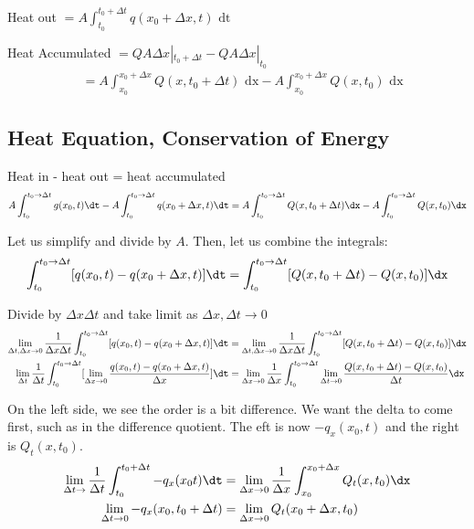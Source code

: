 Heat out $ = A\int_{t_0}^{t_0 + \Delta t} q(x_0 + \Delta x, t) \text{ dt}$

Heat Accumulated $ = QA\Delta x |_{t_0 + \Delta t} - QA\Delta x|_{t_0}$
%
\begin{align}
  & = A\int^{x_0 + \Delta x}_{x_0} Q(x, t_0 + \Delta t) \text{ dx} - A\int^{x_0 + \Delta x}_{x_0} Q(x, t_0) \text{ dx}
\end{align}

\bigbreak

\subsection{Heat Equation, Conservation of Energy}


Heat in - heat out = heat accumulated
%
\begin{align}
  A \int^{t_0 \rightarrow \Delta t}_{t_0} g(x_0, t) \dt -
  A \int^{t_0 \rightarrow \Delta t}_{t_0} q(x_0 + \Delta x, t) \dt =
  A \int^{t_0 \rightarrow \Delta t}_{t_0} Q(x, t_0 + \Delta t) \dx -
  A \int^{t_0 \rightarrow \Delta t}_{t_0} Q(x, t_0) \dx
\end{align}

Let us simplify and divide by $A$. Then, let us combine the integrals:
%
\begin{align}
  \int^{t_0 \rightarrow \Delta t}_{t_0} [q(x_0, t) - q(x_0 + \Delta x, t)] \dt =
  \int^{t_0 \rightarrow \Delta t}_{t_0} [Q(x, t_0 + \Delta t) - Q(x, t_0)] \dx
\end{align}

Divide by $\Delta x \Delta t$ and take limit as $\Delta x, \Delta t \rightarrow 0$
%
\begin{align}
  \lim_{\Delta t, \Delta x \rightarrow 0} \frac{1}{\Delta x \Delta t}
  \int^{t_0 \rightarrow \Delta t}_{t_0} [q(x_0, t) - q(x_0 + \Delta x, t)] \dt & =
  \lim_{\Delta t, \Delta x \rightarrow 0} \frac{1}{\Delta x \Delta t}
  \int^{t_0 \rightarrow \Delta t}_{t_0} [Q(x, t_0 + \Delta t) - Q(x, t_0)] \dx\\
  \lim_{\Delta t} \frac{1}{\Delta t} \int^{t_0 \rightarrow \Delta t}_{t_0} [\lim_{\Delta x \rightarrow 0} \frac{q(x_0, t) - q(x_0 + \Delta x, t)}{\Delta x}] \dt & =
  \lim_{\Delta x \rightarrow 0} \frac{1}{\Delta x}
  \int^{t_0 \rightarrow \Delta t}_{t_0} \lim_{\Delta t \rightarrow 0} \frac
  {Q(x, t_0 + \Delta t) - Q(x, t_0)}{\Delta t} \dx
\end{align}

On the left side, we see the order is a bit difference. We want the delta to come first, such as in the difference quotient. The eft is now $-q_x(x_0, t)$ and the right is $Q_t(x, t_0)$.
%
\begin{align}
  \lim_{\Delta t \rightarrow} \frac{1}{\Delta t} \int^{t_0 + \Delta t}_{t_0} - q_x(x_0 t) \dt & =
  \lim_{\Delta x \rightarrow 0} \frac{1}{\Delta x} \int^{x_0 + \Delta x}_{x_0} Q_t(x, t_0) \dx\\
  \lim_{\Delta t \rightarrow 0} -q_x(x_0, t_0 + \Delta t) & = \lim_{\Delta x \rightarrow 0} Q_t(x_0 + \Delta x, t_0)
\end{align}

